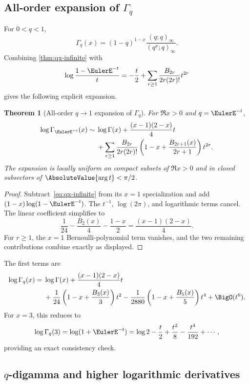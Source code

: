 \documentclass[11pt,oneside]{article}
\newtheorem{theorem}{Theorem}[section]
\theoremstyle{definition}
\theoremstyle{remark}
\let\reportsubsection\subsection
\let\section\reportsubsection
\begin{document}
\section{All-order expansion of \texorpdfstring{$\Gamma_q$}{q-gamma}}

For $0<q<1$,
\[
 \Gamma_q(x)=(1-q)^{1-x}\frac{(q;q)_\infty}{(q^x;q)_\infty}.
\]
Combining \cref{thm:qx-infinite} with
\[
 \log\frac{1-\EulerE^{-t}}t
 =-\frac t2+\sum_{r\ge1}\frac{B_{2r}}{2r(2r)!}t^{2r}
\]
gives the following explicit expansion.

\begin{theorem}[All-order $q\to1$ expansion of $\Gamma_q$]
\label{thm:qgamma-all}
For $\Re x>0$ and $q=\EulerE^{-t}$,
\begin{align}
 \log\Gamma_{\EulerE^{-t}}(x)
 \sim{}&\log\Gamma(x)+\frac{(x-1)(2-x)}4t
 \notag\\
 &+\sum_{r\ge1}\frac{B_{2r}}{2r(2r)!}
 \left(1-x+\frac{B_{2r+1}(x)}{2r+1}\right)t^{2r}.
 \label{eq:qgamma-all}
\end{align}
The expansion is locally uniform on compact subsets of $\Re x>0$ and in closed
subsectors of $\AbsoluteValue{\arg t}<\pi/2$.
\end{theorem}

\begin{proof}
Subtract~\eqref{eq:qx-infinite} from its $x=1$ specialization and add
$(1-x)\log(1-\EulerE^{-t})$.  The $t^{-1}$, $\log(2\pi)$, and logarithmic terms
cancel.  The linear coefficient simplifies to
\[
 \frac1{24}-\frac{B_2(x)}4-\frac{1-x}{2}
 =\frac{(x-1)(2-x)}4.
\]
For $r\ge1$, the $x=1$ Bernoulli-polynomial term vanishes, and the two remaining
contributions combine exactly as displayed.
\end{proof}

The first terms are
\begin{align}
 \log\Gamma_q(x)
 ={}&\log\Gamma(x)+\frac{(x-1)(2-x)}4t
 \notag\\
 &+\frac1{24}\left(1-x+\frac{B_3(x)}3\right)t^2
 -\frac1{2880}\left(1-x+\frac{B_5(x)}5\right)t^4
 +\BigO(t^6).                                      \label{eq:qgamma-first}
\end{align}
For $x=3$, this reduces to
\[
 \log\Gamma_q(3)=\log(1+\EulerE^{-t})
 =\log2-\frac t2+\frac{t^2}{8}-\frac{t^4}{192}+\cdots,
\]
providing an exact consistency check.

\section{\texorpdfstring{$q$}{q}-digamma and higher logarithmic derivatives}
\end{document}
